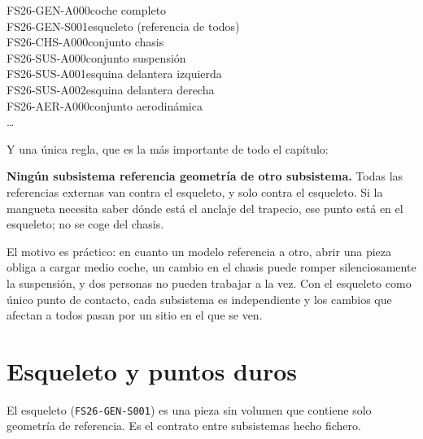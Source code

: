 \begin{center}
\begin{minipage}{0.8\textwidth}
\ttfamily\small
FS26-GEN-A000\quad coche completo\\
\hspace*{1em}FS26-GEN-S001\quad esqueleto (referencia de todos)\\
\hspace*{1em}FS26-CHS-A000\quad conjunto chasis\\
\hspace*{1em}FS26-SUS-A000\quad conjunto suspensión\\
\hspace*{2em}FS26-SUS-A001\quad esquina delantera izquierda\\
\hspace*{2em}FS26-SUS-A002\quad esquina delantera derecha\\
\hspace*{1em}FS26-AER-A000\quad conjunto aerodinámica\\
\hspace*{1em}\ldots
\end{minipage}
\end{center}

Y una única regla, que es la más importante de todo el capítulo:

\begin{clave}
\textbf{Ningún subsistema referencia geometría de otro subsistema.} Todas las
referencias externas van contra el esqueleto, y solo contra el esqueleto. Si la
mangueta necesita saber dónde está el anclaje del trapecio, ese punto está en el
esqueleto; no se coge del chasis.
\end{clave}

El motivo es práctico: en cuanto un modelo referencia a otro, abrir una pieza
obliga a cargar medio coche, un cambio en el chasis puede romper silenciosamente
la suspensión, y dos personas no pueden trabajar a la vez. Con el esqueleto como
único punto de contacto, cada subsistema es independiente y los cambios que
afectan a todos pasan por un sitio en el que se ven.

\section{Esqueleto y puntos duros}
\label{sec:herramientas_cad_datos:02}

El esqueleto (\texttt{FS26-GEN-S001}) es una pieza sin volumen que contiene solo
geometría de referencia. Es el contrato entre subsistemas hecho fichero.

